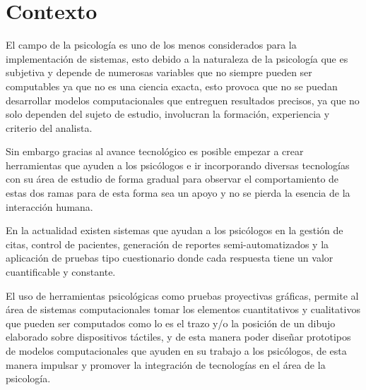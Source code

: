 \section{Contexto}

El campo de la psicología es uno de los menos considerados para la implementación de sistemas, esto debido a la naturaleza de la psicología que es subjetiva y depende de numerosas variables que no siempre pueden ser computables ya que no es una ciencia exacta, esto provoca que no se puedan desarrollar modelos computacionales que entreguen resultados precisos, ya que no solo dependen del sujeto de estudio, involucran la formación, experiencia y criterio del analista.

Sin embargo gracias al avance tecnológico es posible empezar a crear herramientas que ayuden a los psicólogos e ir incorporando diversas tecnologías con su área de estudio de forma gradual para observar el comportamiento de estas dos ramas para de esta forma sea un apoyo y no se pierda la esencia de la interacción humana.

En la actualidad existen sistemas que ayudan a los psicólogos en la gestión de citas, control de pacientes, generación de reportes semi-automatizados y la aplicación de pruebas tipo cuestionario donde cada respuesta tiene un valor cuantificable y constante.

El uso de herramientas psicológicas como pruebas proyectivas gráficas, permite al área de sistemas computacionales tomar los elementos cuantitativos y cualitativos que pueden ser computados como lo es el trazo y/o la posición de un dibujo elaborado sobre dispositivos táctiles, y de esta manera poder diseñar prototipos de modelos computacionales que ayuden en su trabajo a los psicólogos, de esta manera impulsar y promover la integración de tecnologías en el área de la psicología.